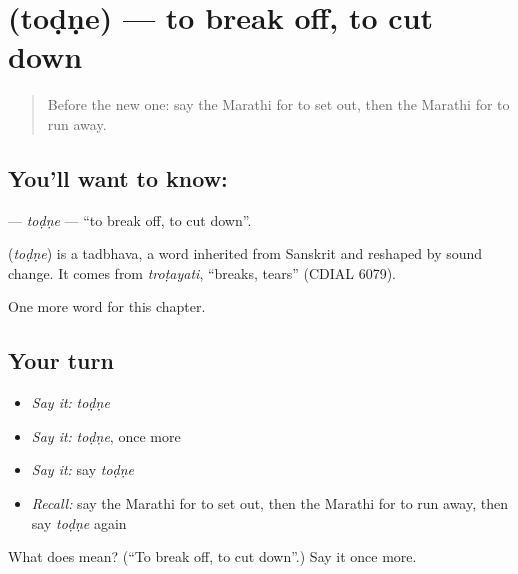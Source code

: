 \section[\texorpdfstring{\mr{तोडणे} (toḍṇe)}{तोडणे (toḍṇe)}]{ (toḍṇe) — to break off, to cut down}

\label{lesson:MR-C154-todne}



\begin{quote}
Before the new one: say the Marathi for to set out, then the Marathi for to run away.
\end{quote}

\subsection*{You'll want to know: }
\textbf{} — \emph{toḍṇe} — \textquotedblleft{}to break off, to cut down\textquotedblright{}.

\begin{cousinweb}
\textbf{} (\emph{toḍṇe}) is a tadbhava, a word inherited from Sanskrit and reshaped by sound change. It comes from \emph{troṭayati}, \textquotedblleft{}breaks, tears\textquotedblright{} (CDIAL 6079).
\end{cousinweb}

\begin{grammarlens}[title={What you've built}]
One more word for this chapter.
\end{grammarlens}

\subsection*{Your turn}
\begin{itemize}
\raggedright
  \item \emph{Say it:} \emph{toḍṇe}
  \item \emph{Say it:} \emph{toḍṇe}, once more
  \item \emph{Say it:} say \emph{toḍṇe}
  \item \emph{Recall:} say the Marathi for to set out, then the Marathi for to run away, then say \emph{toḍṇe} again
\end{itemize}

\begin{tcolorbox}[breakable,colback=teal!4,colframe=teal!35!black,title={Before you move on}]
What does  mean? (\textquotedblleft{}To break off, to cut down\textquotedblright{}.) Say it once more.
\end{tcolorbox}
